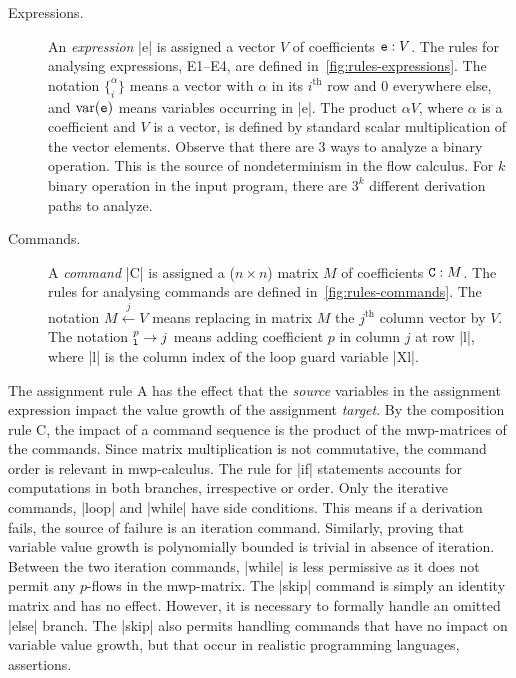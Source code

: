\begin{description}
\item[Expressions.]
An \emph{expression} \pr|e| is assigned a vector \(V\) of coefficients \(\prm{e} : V\).
The rules for analysing expressions, E1--E4, are defined in~\autoref{fig:rules-expressions}.
The notation \(\{_{i}^{\alpha}\}\) means a vector with \(\alpha\) in its \(i^\text{th}\) row and $0$ everywhere else, and \(\var(\prm{e})\) means variables occurring in \pr|e|.
The product \(\alpha V\), where \(\alpha\) is a coefficient and \(V\) is a vector, is defined by
standard scalar multiplication of the vector elements.
Observe that there are 3 ways to analyze a binary operation.
This is the source of nondeterminism in the flow calculus.
For \(k\) binary operation in the input program, there are \(3^k\) different derivation paths to analyze.
\item[Commands.]
A \emph{command} \pr|C| is assigned a (\(n \times n\)) matrix \(M\) of coefficients \(\prm{C} : M\).
The rules for analysing commands are defined in~\autoref{fig:rules-commands}.
The notation \(M \xleftarrow{j} V\) means replacing in matrix $M$ the \(j^\text{th}\) column vector by $V$.
The notation \(_{\text{\pr|l|}}^{p}\rightarrow j\) means adding coefficient \(p\) in column \(j\) at row \pr|l|,
where \pr|l| is the column index of the loop guard variable \pr|Xl|.
\end{description}
The assignment rule A has the effect that the \emph{source} variables in the assignment expression impact the value growth of the assignment \emph{target}.
By the composition rule C, the impact of a command sequence is the product of the mwp-matrices of the commands.
Since matrix multiplication is not commutative, the command order is relevant in mwp-calculus.
The rule for \pr|if| statements accounts for computations in both branches, irrespective or order.
Only the iterative commands, \pr|loop| and \pr|while| have side conditions.
This means if a derivation fails, the source of failure is an iteration command.
Similarly, proving that variable value growth is polynomially bounded is trivial in absence of iteration.
Between the two iteration commands, \pr|while| is less permissive as it does not permit any \(p\)-flows in the mwp-matrix.
The \pr|skip| command is simply an identity matrix and has no effect.
However, it is necessary to formally handle \eg an omitted \pr|else| branch.
The \pr|skip| also permits handling commands that have no impact on variable value growth,
but that occur in realistic programming languages, \eg assertions.


